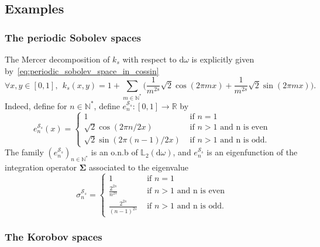 \documentclass[twoside,11pt]{book}
\numberwithin{theorem}{chapter}
\numberwithin{definition}{chapter}
\numberwithin{proposition}{chapter}
\numberwithin{corollary}{chapter}
\numberwithin{example}{chapter}
\numberwithin{lemma}{chapter}
\numberwithin{assumption}{chapter}
\begin{document}
\subsection{Examples}
\label{subsec:kernel_examples}
\subsubsection{The periodic Sobolev spaces}
The Mercer decomposition of $k_{s}$ with respect to $\mathrm{d}\omega$ is explicitly given by~\eqref{eq:periodic_sobolev_space_in_cossin}
\begin{equation}
\forall x,y \in [0,1], \:\: k_{s}(x,y) = 1+ \sum\limits_{m \in \mathbb{N}^{*}} \Big( \frac{1}{m^{2s}} \sqrt{2}\cos (2\pi mx) + \frac{1}{m^{2s}} \sqrt{2}\sin (2\pi mx) \Big).
\end{equation}
Indeed, define for $n \in \mathbb{N}^{*}$, define $e_{n}^{\mathcal{S}_{s}}:[0,1] \rightarrow \mathbb{R}$ by
$$
e_{n}^{\mathcal{S}_{s}}(x) = \left\{
    \begin{array}{ll}
     1 & \text{ if } n=1\\
     \sqrt{2} \cos(2\pi n/2 x) & \text{ if } n>1 \text{ and n is even}\\
     \sqrt{2} \sin(2\pi (n-1)/2 x) & \text{ if } n>1 \text{ and n is odd}.
\end{array}
\right.
$$
The family $(e_n^{\mathcal{S}_{s}})_{n \in \mathbb{N}^{*}}$ is an o.n.b of $\mathbb{L}_{2}(\mathrm{d}\omega)$, and $e_n^{\mathcal{S}_{s}}$ is an eigenfunction of the integration operator $\bm{\Sigma}$ associated to the eigenvalue
$$
\sigma_{n}^{\mathcal{S}_{s}} = \left\{
    \begin{array}{ll}
     1 & \text{ if } n=1\\
     \frac{2^{2s}}{n^{2s}} & \text{ if } n>1 \text{ and n is even}\\
     \frac{2^{2s}}{(n-1)^{2s}} & \text{ if } n>1 \text{ and n is odd}.
\end{array}
\right.
$$

\subsubsection{The Korobov spaces}\label{sec:Korobov_spaces_def}
\end{document}

